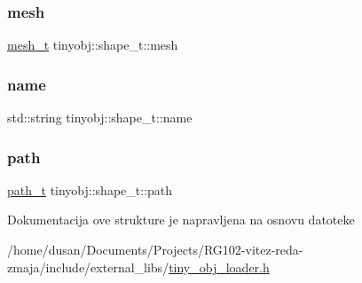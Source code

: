 \subsubsection{\texorpdfstring{mesh}{mesh}}
{\footnotesize\ttfamily \hyperlink{structtinyobj_1_1mesh__t}{mesh\+\_\+t} tinyobj\+::shape\+\_\+t\+::mesh}

\mbox{\label{structtinyobj_1_1shape__t_a98650e2e66d00934f68de88eafb34630}} 
\subsubsection{\texorpdfstring{name}{name}}
{\footnotesize\ttfamily std\+::string tinyobj\+::shape\+\_\+t\+::name}

\mbox{\label{structtinyobj_1_1shape__t_a3e25b80e1330260be137eb865ec0b958}} 
\subsubsection{\texorpdfstring{path}{path}}
{\footnotesize\ttfamily \hyperlink{structtinyobj_1_1path__t}{path\+\_\+t} tinyobj\+::shape\+\_\+t\+::path}



Dokumentacija ove strukture je napravljena na osnovu datoteke \begin{DoxyCompactItemize}
\item 
/home/dusan/\+Documents/\+Projects/\+R\+G102-\/vitez-\/reda-\/zmaja/include/external\+\_\+libs/\hyperlink{tiny__obj__loader_8h}{tiny\+\_\+obj\+\_\+loader.\+h}\end{DoxyCompactItemize}
